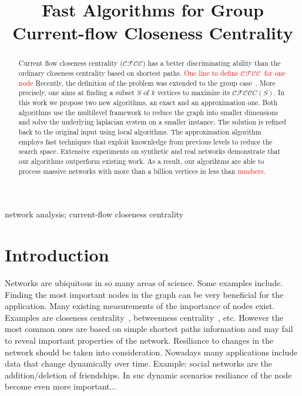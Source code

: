\documentclass[10pt, conference, compsocconf]{IEEEtran}
\author{
\IEEEauthorblockN{Blah Blah}
\IEEEauthorblockA{Humboldt University, Berlin, Germany\\
Email: kdfkfd@informatik.hu-berlin.de}
\and
\IEEEauthorblockN{Blah Blah}
\IEEEauthorblockA{Humboldt University, Berlin, Germany\\
Email: lrpwor@informatik.hu-berlin.de}
}
\newcommand{\cfc}{$\mathcal{CFCC}$}
\newcommand{\mpre}[1]{\textcolor{red}{#1}\xspace}
\begin{document}
 \title{Fast Algorithms for Group Current-flow Closeness Centrality}

\maketitle 

\begin{abstract}
  Current flow closeness centrality (\cfc) has a better discriminating ability than the
  ordinary closeness centrality based on shortest paths. \mpre{One line to define \cfc~for one node}
  Recently, the definition of the problem was extended to the group case~\cite{Li18}.
  More precisely, one aims at finding a subset $S$ of $k$ vertices to maximize
  its \cfc $C(S)$. In this work we propose two new algorithms, an exact and
  an approximation one. Both algorithms use the multilevel framework to reduce
  the graph into smaller dimensions and
  solve the underlying laplacian system on a smaller instance.
  The solution is refined back to the original input
  using local algorithms. %
  The approximation algorithm employs fast techniques that exploit knownledge
  from previous levels to reduce the search space. Extensive experiments on synthetic
  and real networks demonstrate that our algorithms
  outperform existing work. As a result, our algorihtms are able to process massive
  networks with more than a billion vertices in less than \mpre{numbers}.
\end{abstract}

\begin{IEEEkeywords}
network analysis; current-flow closeness centrality
\end{IEEEkeywords}



%
%
\section{Introduction}
\label{sec:intro}
Networks are ubiquitous in so many areas of science. Some examples include.
Finding the most important nodes in the graph can be very beneficial for the application.
Many existing measurements of the importance of nodes exist. Examples are
closeness centrality~\cite{}, betweenness centrality~\cite{}, etc.
However the most common ones are based on simple shortest paths information
and may fail to reveal important properties of the network. Resiliance to
changes in the network should be taken into consideration. Nowadays many
applications include data that change dynamically over time. Example: social networks
are the addition/deletion of friendships. In suc dynamic scenarios resiliance
of the node become even more important...
\end{document}

